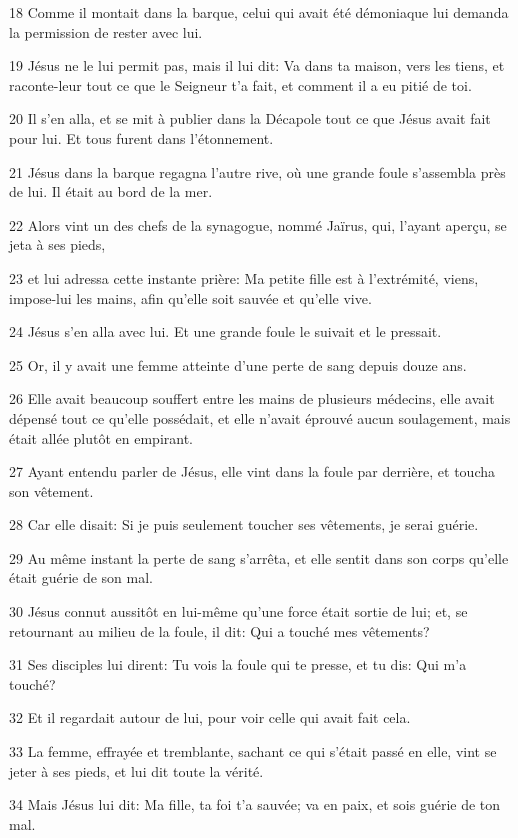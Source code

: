 \par 18 Comme il montait dans la barque, celui qui avait été démoniaque lui demanda la permission de rester avec lui.
\par 19 Jésus ne le lui permit pas, mais il lui dit: Va dans ta maison, vers les tiens, et raconte-leur tout ce que le Seigneur t'a fait, et comment il a eu pitié de toi.
\par 20 Il s'en alla, et se mit à publier dans la Décapole tout ce que Jésus avait fait pour lui. Et tous furent dans l'étonnement.
\par 21 Jésus dans la barque regagna l'autre rive, où une grande foule s'assembla près de lui. Il était au bord de la mer.
\par 22 Alors vint un des chefs de la synagogue, nommé Jaïrus, qui, l'ayant aperçu, se jeta à ses pieds,
\par 23 et lui adressa cette instante prière: Ma petite fille est à l'extrémité, viens, impose-lui les mains, afin qu'elle soit sauvée et qu'elle vive.
\par 24 Jésus s'en alla avec lui. Et une grande foule le suivait et le pressait.
\par 25 Or, il y avait une femme atteinte d'une perte de sang depuis douze ans.
\par 26 Elle avait beaucoup souffert entre les mains de plusieurs médecins, elle avait dépensé tout ce qu'elle possédait, et elle n'avait éprouvé aucun soulagement, mais était allée plutôt en empirant.
\par 27 Ayant entendu parler de Jésus, elle vint dans la foule par derrière, et toucha son vêtement.
\par 28 Car elle disait: Si je puis seulement toucher ses vêtements, je serai guérie.
\par 29 Au même instant la perte de sang s'arrêta, et elle sentit dans son corps qu'elle était guérie de son mal.
\par 30 Jésus connut aussitôt en lui-même qu'une force était sortie de lui; et, se retournant au milieu de la foule, il dit: Qui a touché mes vêtements?
\par 31 Ses disciples lui dirent: Tu vois la foule qui te presse, et tu dis: Qui m'a touché?
\par 32 Et il regardait autour de lui, pour voir celle qui avait fait cela.
\par 33 La femme, effrayée et tremblante, sachant ce qui s'était passé en elle, vint se jeter à ses pieds, et lui dit toute la vérité.
\par 34 Mais Jésus lui dit: Ma fille, ta foi t'a sauvée; va en paix, et sois guérie de ton mal.
